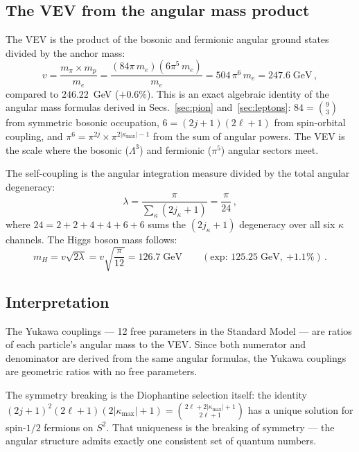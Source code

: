 \documentclass[aps,prd,twocolumn,superscriptaddress,nofootinbib,longbibliography]{revtex4-2}
\newcommand{\kmax}{|\kappa_{\mathrm{max}}|}
\begin{document}
\subsection{The VEV from the angular mass product}

The VEV is the product of the bosonic and fermionic angular ground
states divided by the anchor mass:
\begin{equation}\label{eq:higgs-vev}
  v = \frac{m_\pi \times m_p}{m_e}
  = \frac{(84\pi\,m_e)(6\pi^5\,m_e)}{m_e}
  = 504\,\pi^6\,m_e = 247.6\;\text{GeV}\,,
\end{equation}
compared to $246.22$~GeV ($+0.6\%$).  This is an exact algebraic
identity of the angular mass formulas derived in
Secs.~\ref{sec:pion} and~\ref{sec:leptons}: $84 = \binom{9}{3}$
from symmetric bosonic occupation, $6 = (2j+1)(2\ell+1)$ from
spin-orbital coupling, and
$\pi^6 = \pi^{2j} \times \pi^{2\kmax-1}$ from the sum of angular
powers.  The VEV is the scale where the bosonic ($\Lambda^3$) and
fermionic ($\pi^5$) angular sectors meet.

The self-coupling is the angular integration measure divided by the
total angular degeneracy:
\begin{equation}\label{eq:higgs-lambda}
  \lambda = \frac{\pi}{\sum_\kappa (2j_\kappa+1)}
  = \frac{\pi}{24}\,,
\end{equation}
where $24 = 2+2+4+4+6+6$ sums the $(2j_\kappa+1)$ degeneracy over
all six $\kappa$ channels.  The Higgs boson mass follows:
\begin{equation}\label{eq:higgs-mass}
  m_H = v\sqrt{2\lambda} = v\sqrt{\frac{\pi}{12}}
  = 126.7\;\text{GeV}
  \qquad(\text{exp: }125.25\;\text{GeV},\ {+1.1\%})\,.
\end{equation}

\subsection{Interpretation}

The Yukawa couplings --- 12 free parameters in the Standard Model ---
are ratios of each particle's angular mass to the VEV.  Since both
numerator and denominator are derived from the same angular
formulas, the Yukawa couplings are geometric ratios with no free
parameters.

The symmetry breaking is the Diophantine selection itself: the
identity $(2j+1)^2(2\ell+1)(2\kmax+1) = \binom{2\ell+2\kmax+1}{2\ell+1}$
has a unique solution for spin-$1/2$ fermions on $S^2$.  That
uniqueness is the breaking of symmetry --- the angular structure
admits exactly one consistent set of quantum numbers.
\end{document}
